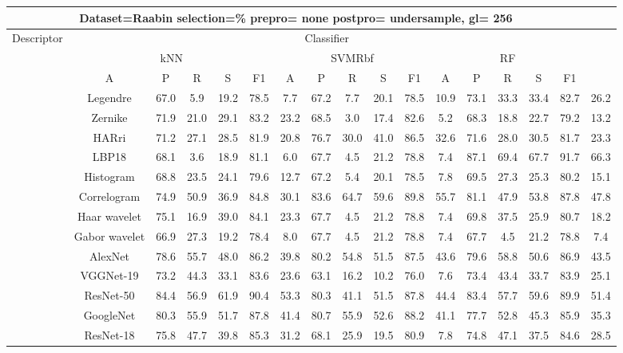\documentclass[12pt,italian]{article}
\begin{document}
\begin{tiny}
\begin{longtable}{lcccccccccccccccc}
\toprule
\multicolumn{16}{c}{Dataset=Raabin selection=\% prepro= none postpro= undersample, gl= 256} \\ 
\toprule
Descriptor & \multicolumn{15}{c}{Classifier} \\ 
& \multicolumn{5}{c}{kNN} & \multicolumn{5}{c}{SVMRbf} & \multicolumn{5}{c}{RF} \\ 
& A & P & R & S & F1 & A & P & R & S & F1 & A & P & R & S & F1 \\ 
\midrule
& Legendre & 67.0 &  5.9 & 19.2 & 78.5 &  7.7 & 67.2 &  7.7 & 20.1 & 78.5 & 10.9 & 73.1 & 33.3 & 33.4 & 82.7 & 26.2 \\ 
& Zernike & 71.9 & 21.0 & 29.1 & 83.2 & 23.2 & 68.5 &  3.0 & 17.4 & 82.6 &  5.2 & 68.3 & 18.8 & 22.7 & 79.2 & 13.2 \\ 
& HARri & 71.2 & 27.1 & 28.5 & 81.9 & 20.8 & 76.7 & 30.0 & 41.0 & 86.5 & 32.6 & 71.6 & 28.0 & 30.5 & 81.7 & 23.3 \\ 
& LBP18 & 68.1 &  3.6 & 18.9 & 81.1 &  6.0 & 67.7 &  4.5 & 21.2 & 78.8 &  7.4 & 87.1 & 69.4 & 67.7 & 91.7 & 66.3 \\ 
& Histogram & 68.8 & 23.5 & 24.1 & 79.6 & 12.7 & 67.2 &  5.4 & 20.1 & 78.5 &  7.8 & 69.5 & 27.3 & 25.3 & 80.2 & 15.1 \\ 
& Correlogram & 74.9 & 50.9 & 36.9 & 84.8 & 30.1 & 83.6 & 64.7 & 59.6 & 89.8 & 55.7 & 81.1 & 47.9 & 53.8 & 87.8 & 47.8 \\ 
& Haar wavelet & 75.1 & 16.9 & 39.0 & 84.1 & 23.3 & 67.7 &  4.5 & 21.2 & 78.8 &  7.4 & 69.8 & 37.5 & 25.9 & 80.7 & 18.2 \\ 
& Gabor wavelet & 66.9 & 27.3 & 19.2 & 78.4 &  8.0 & 67.7 &  4.5 & 21.2 & 78.8 &  7.4 & 67.7 &  4.5 & 21.2 & 78.8 &  7.4 \\ 
& AlexNet & 78.6 & 55.7 & 48.0 & 86.2 & 39.8 & 80.2 & 54.8 & 51.5 & 87.5 & 43.6 & 79.6 & 58.8 & 50.6 & 86.9 & 43.5 \\ 
& VGGNet-19 & 73.2 & 44.3 & 33.1 & 83.6 & 23.6 & 63.1 & 16.2 & 10.2 & 76.0 &  7.6 & 73.4 & 43.4 & 33.7 & 83.9 & 25.1 \\ 
& ResNet-50 & 84.4 & 56.9 & 61.9 & 90.4 & 53.3 & 80.3 & 41.1 & 51.5 & 87.8 & 44.4 & 83.4 & 57.7 & 59.6 & 89.9 & 51.4 \\ 
& GoogleNet & 80.3 & 55.9 & 51.7 & 87.8 & 41.4 & 80.7 & 55.9 & 52.6 & 88.2 & 41.1 & 77.7 & 52.8 & 45.3 & 85.9 & 35.3 \\ 
& ResNet-18 & 75.8 & 47.7 & 39.8 & 85.3 & 31.2 & 68.1 & 25.9 & 19.5 & 80.9 &  7.8 & 74.8 & 47.1 & 37.5 & 84.6 & 28.5 \\ 

\end{longtable}
\end{tiny}
\end{document}
